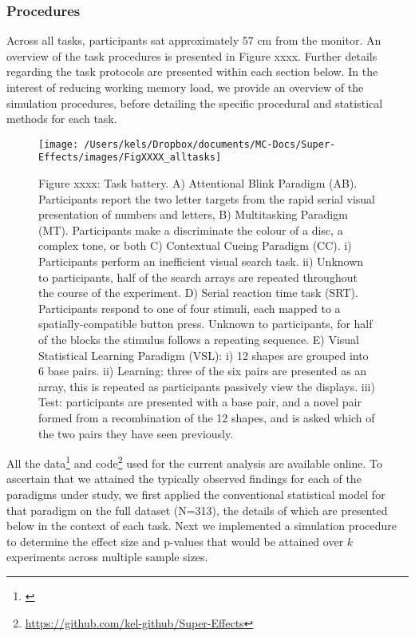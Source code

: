 \documentclass[
  12pt,
]{article}
\DeclareRobustCommand{\href}[2]{#2\footnote{\url{#1}}}
\begin{document}
\hypertarget{procedures}{%
\subsubsection{Procedures}\label{procedures}}

Across all tasks, participants sat approximately 57 cm from the monitor. An overview of the task procedures is presented in Figure xxxx. Further details regarding the task protocols are presented within each section below. In the interest of reducing working memory load, we provide an overview of the simulation procedures, before detailing the specific procedural and statistical methods for each task.

\begin{figure}

{\centering \texttt{[image: /Users/kels/Dropbox/documents/MC-Docs/Super-Effects/images/FigXXXX\_alltasks]} 

}

\caption{Figure xxxx: Task battery. A) Attentional Blink Paradigm (AB). Participants report the two letter targets from the rapid serial visual presentation of numbers and letters, B) Multitasking Paradigm (MT). Participants make a discriminate the colour of a disc, a complex tone, or both C) Contextual Cueing Paradigm (CC). i) Participants perform an inefficient visual search task. ii) Unknown to participants, half of the search arrays are repeated throughout the course of the experiment. D) Serial reaction time task (SRT). Participants respond to one of four stimuli, each mapped to a spatially-compatible button press. Unknown to participants, for half of the blocks the stimulus follows a repeating sequence. E) Visual Statistical Learning Paradigm (VSL): i) 12 shapes are grouped into 6 base pairs. ii) Learning: three of the six pairs are presented as an array, this is repeated as participants passively view the displays. iii) Test: participants are presented with a base pair, and a novel pair formed from a recombination of the 12 shapes, and is asked which of the two pairs they have seen previously.}\label{fig:paradigm}
\end{figure}

All the \href{}{data} and \href{https://github.com/kel-github/Super-Effects}{code} used for the current analysis are available online. To ascertain that we attained the typically observed findings for each of the paradigms under study, we first applied the conventional statistical model for that paradigm on the full dataset (N=313), the details of which are presented below in the context of each task. Next we implemented a simulation procedure to determine the effect size and p-values that would be attained over \(k\) experiments across multiple sample sizes.
\end{document}
